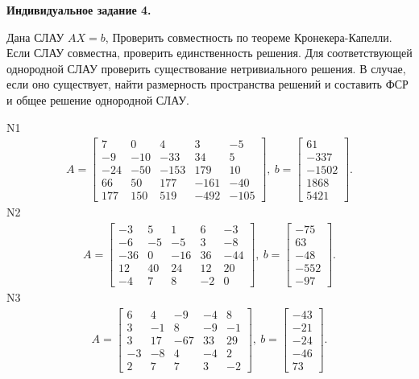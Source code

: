\documentclass[11pt]{report}
\begin{document}
\pagestyle{empty}

{\bf Индивидуальное задание 4.}


Дана СЛАУ $AX = b$, 
Проверить совместность по теореме Кронекера-Капелли. Если СЛАУ совместна, проверить единственность решения.
Для соответствующей однородной СЛАУ проверить существование нетривиального решения. В случае, если оно существует, 
найти размерность пространства решений и составить ФСР и общее решение однородной СЛАУ.


N1
\begin{align*}
 A = \left[\begin{matrix}7 & 0 & 4 & 3 & -5\\-9 & -10 & -33 & 34 & 5\\-24 & -50 & -153 & 179 & 10\\66 & 50 & 177 & -161 & -40\\177 & 150 & 519 & -492 & -105\end{matrix}\right],
\ b = \left[\begin{matrix}61\\-337\\-1502\\1868\\5421\end{matrix}\right]. 
 \end{align*}
N2
\begin{align*}
 A = \left[\begin{matrix}-3 & 5 & 1 & 6 & -3\\-6 & -5 & -5 & 3 & -8\\-36 & 0 & -16 & 36 & -44\\12 & 40 & 24 & 12 & 20\\-4 & 7 & 8 & -2 & 0\end{matrix}\right],
\ b = \left[\begin{matrix}-75\\63\\-48\\-552\\-97\end{matrix}\right]. 
 \end{align*}
N3
\begin{align*}
 A = \left[\begin{matrix}6 & 4 & -9 & -4 & 8\\3 & -1 & 8 & -9 & -1\\3 & 17 & -67 & 33 & 29\\-3 & -8 & 4 & -4 & 2\\2 & 7 & 7 & 3 & -2\end{matrix}\right],
\ b = \left[\begin{matrix}-43\\-21\\-24\\-46\\73\end{matrix}\right]. 
 \end{align*}
\end{document}
